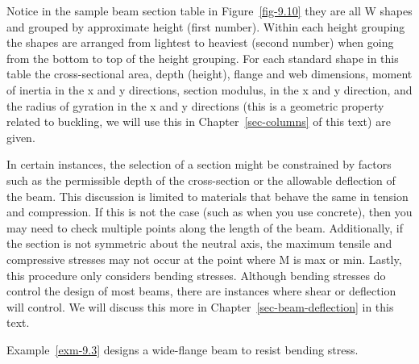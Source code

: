 \documentclass[
  letterpaper,
  DIV=11,
  numbers=noendperiod]{scrreprt}
\theoremstyle{definition}
\theoremstyle{remark}
\begin{document}
Notice in the sample beam section table in Figure~\ref{fig-9.10} they
are all W shapes and grouped by approximate height (first number).
Within each height grouping the shapes are arranged from lightest to
heaviest (second number) when going from the bottom to top of the height
grouping. For each standard shape in this table the cross-sectional
area, depth (height), flange and web dimensions, moment of inertia in
the x and y directions, section modulus, in the x and y direction, and
the radius of gyration in the x and y directions (this is a geometric
property related to buckling, we will use this in
Chapter~\ref{sec-columns} of this text) are given.

In certain instances, the selection of a section might be constrained by
factors such as the permissible depth of the cross-section or the
allowable deflection of the beam. This discussion is limited to
materials that behave the same in tension and compression. If this is
not the case (such as when you use concrete), then you may need to check
multiple points along the length of the beam. Additionally, if the
section is not symmetric about the neutral axis, the maximum tensile and
compressive stresses may not occur at the point where M is max or min.
Lastly, this procedure only considers bending stresses. Although bending
stresses do control the design of most beams, there are instances where
shear or deflection will control. We will discuss this more in
Chapter~\ref{sec-beam-deflection} in this text.

Example~\ref{exm-9.3} designs a wide-flange beam to resist bending
stress.
\end{document}
